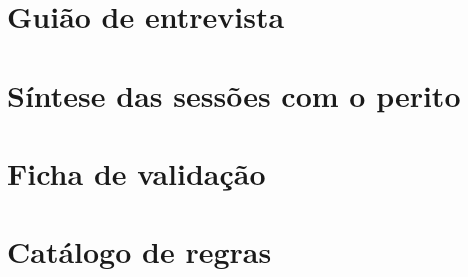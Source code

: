 \chapter{Guião de entrevista}
\label{anx:guiao}


\chapter{Síntese das sessões com o perito}
\label{anx:sessoes}


\chapter{Ficha de validação}
\label{anx:validacao}


\chapter{Catálogo de regras}
\label{anx:regras}

